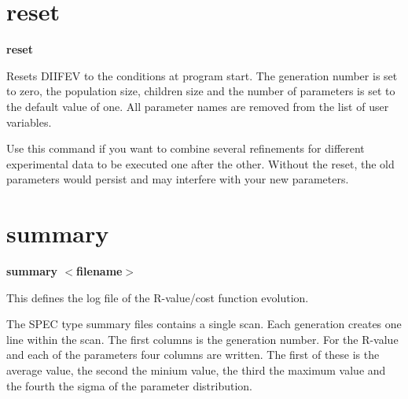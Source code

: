 \section{reset}
{\bf reset \par }
\par
\vspace{3pt}
Resets DIIFEV to the conditions at program start. The generation 
number is set to zero, the population size, children size and the 
number of parameters is set to the default value of one. All parameter 
names are removed from the list of user variables. 
\par
Use this command if you want to combine several refinements 
for different experimental data to be executed one after the other. 
Without the reset, the old parameters would persist and may 
interfere with your new parameters. 
\section{summary}
{\bf summary $ <$filename$> $ \par }
\par
\vspace{3pt}
This defines the log file of the R-value/cost function evolution. 
\par
The SPEC type summary files contains a single scan. Each generation 
creates one line within the scan. The first columns is the generation 
number. For the R-value and each of the parameters four columns are 
written. The first of these is the average value, the second the 
minium value, the third the maximum value and the fourth the sigma of 
the parameter distribution. 
